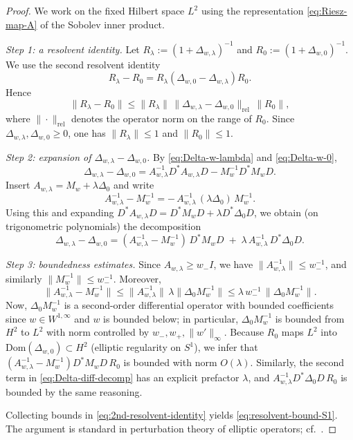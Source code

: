 \documentclass{amsart}
\numberwithin{equation}{section}
\theoremstyle{definition}
\theoremstyle{remark}
\begin{document}
\begin{proof}
We work on the fixed Hilbert space $L^2$ using the representation
\eqref{eq:Riesz-map-A} of the Sobolev inner product.

\smallskip
\noindent\emph{Step 1: a resolvent identity.}
Let $R_\lambda:=(1+\Delta_{w,\lambda})^{-1}$ and $R_0:=(1+\Delta_{w,0})^{-1}$.
We use the second resolvent identity
\begin{equation}\label{eq:2nd-resolvent-identity}
R_\lambda-R_0 = R_\lambda(\Delta_{w,0}-\Delta_{w,\lambda})R_0.
\end{equation}
Hence
\[
\|R_\lambda-R_0\|\le \|R_\lambda\|\,\|\Delta_{w,\lambda}-\Delta_{w,0}\|_{\mathrm{rel}}\,\|R_0\|,
\]
where $\|\cdot\|_{\mathrm{rel}}$ denotes the operator norm on the range of $R_0$.
Since $\Delta_{w,\lambda},\Delta_{w,0}\ge0$, one has $\|R_\lambda\|\le1$ and $\|R_0\|\le1$.

\smallskip
\noindent\emph{Step 2: expansion of $\Delta_{w,\lambda}-\Delta_{w,0}$.}
By \eqref{eq:Delta-w-lambda} and \eqref{eq:Delta-w-0},
\[
\Delta_{w,\lambda}-\Delta_{w,0}
=
A_{w,\lambda}^{-1}D^*A_{w,\lambda}D
-
M_w^{-1}D^*M_wD.
\]
Insert $A_{w,\lambda}=M_w+\lambda\Delta_0$ and write
\[
A_{w,\lambda}^{-1}-M_w^{-1} = -\,A_{w,\lambda}^{-1}\,(\lambda\Delta_0)\,M_w^{-1}.
\]
Using this and expanding $D^*A_{w,\lambda}D=D^*M_wD+\lambda D^*\Delta_0 D$,
we obtain (on trigonometric polynomials) the decomposition
\begin{equation}\label{eq:Delta-diff-decomp}
\Delta_{w,\lambda}-\Delta_{w,0}
=
(A_{w,\lambda}^{-1}-M_w^{-1})\,D^*M_wD
\;+\;
\lambda\,A_{w,\lambda}^{-1}\,D^*\Delta_0 D.
\end{equation}

\smallskip
\noindent\emph{Step 3: boundedness estimates.}
Since $A_{w,\lambda}\ge w_- I$, we have $\|A_{w,\lambda}^{-1}\|\le w_-^{-1}$,
and similarly $\|M_w^{-1}\|\le w_-^{-1}$.
Moreover,
\[
\|A_{w,\lambda}^{-1}-M_w^{-1}\|
\le \|A_{w,\lambda}^{-1}\|\,\lambda\|\Delta_0 M_w^{-1}\|
\le \lambda\,w_-^{-1}\,\|\Delta_0 M_w^{-1}\|.
\]
Now, $\Delta_0 M_w^{-1}$ is a second-order differential operator with bounded coefficients
since $w\in W^{1,\infty}$ and $w$ is bounded below; in particular,
$\Delta_0 M_w^{-1}$ is bounded from $H^2$ to $L^2$ with norm controlled by
$w_-,w_+,\|w'\|_\infty$.
Because $R_0$ maps $L^2$ into $\mathrm{Dom}(\Delta_{w,0})\subset H^2$ (elliptic regularity on $S^1$),
we infer that $(A_{w,\lambda}^{-1}-M_w^{-1})D^*M_wD\,R_0$ is bounded with norm $O(\lambda)$.
Similarly, the second term in \eqref{eq:Delta-diff-decomp} has an explicit prefactor $\lambda$,
and $A_{w,\lambda}^{-1}D^*\Delta_0 D\,R_0$ is bounded by the same reasoning.

\smallskip
Collecting bounds in \eqref{eq:2nd-resolvent-identity} yields
\eqref{eq:resolvent-bound-S1}.
The argument is standard in perturbation theory of elliptic operators; cf.\ \cite{Kato,Ouhabaz}.
\end{proof}
\end{document}
